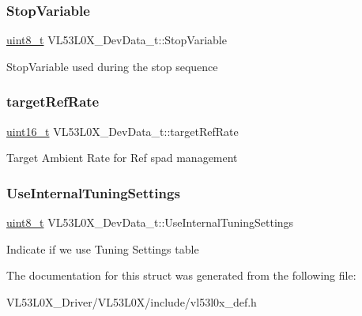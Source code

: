 \subsubsection{\texorpdfstring{Stop\+Variable}{StopVariable}}
{\footnotesize\ttfamily \hyperlink{vl53l0x__types_8h_aba7bc1797add20fe3efdf37ced1182c5}{uint8\+\_\+t} V\+L53\+L0\+X\+\_\+\+Dev\+Data\+\_\+t\+::\+Stop\+Variable}

Stop\+Variable used during the stop sequence \mbox{\label{structVL53L0X__DevData__t_adfd2ebd6ffbb3e0d6b6f215f43acaf70}} 
\subsubsection{\texorpdfstring{target\+Ref\+Rate}{targetRefRate}}
{\footnotesize\ttfamily \hyperlink{vl53l0x__types_8h_a273cf69d639a59973b6019625df33e30}{uint16\+\_\+t} V\+L53\+L0\+X\+\_\+\+Dev\+Data\+\_\+t\+::target\+Ref\+Rate}

Target Ambient Rate for Ref spad management \mbox{\label{structVL53L0X__DevData__t_af639b5aecb7430bef08d614a2a65a059}} 
\subsubsection{\texorpdfstring{Use\+Internal\+Tuning\+Settings}{UseInternalTuningSettings}}
{\footnotesize\ttfamily \hyperlink{vl53l0x__types_8h_aba7bc1797add20fe3efdf37ced1182c5}{uint8\+\_\+t} V\+L53\+L0\+X\+\_\+\+Dev\+Data\+\_\+t\+::\+Use\+Internal\+Tuning\+Settings}

Indicate if we use Tuning Settings table 

The documentation for this struct was generated from the following file\+:\begin{DoxyCompactItemize}
\item 
V\+L53\+L0\+X\+\_\+\+Driver/\+V\+L53\+L0\+X/include/vl53l0x\+\_\+def.\+h\end{DoxyCompactItemize}
